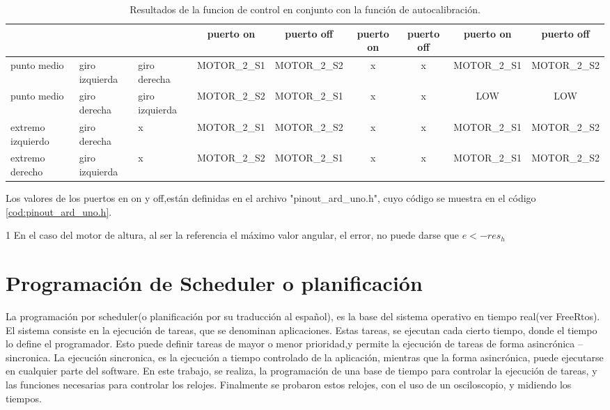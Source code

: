 \begin{table}[ht]
{\begin{threeparttable}
\begin{tabular}{|p{1.5cm}|p{1.5cm}|p{1.5cm}|c|c|c|c|c|c|}
		& &  & puerto on & puerto off &puerto on & puerto off&puerto on & puerto off\\ 
		\hline 
		punto medio & giro izquierda & giro derecha &  MOTOR\_2\_S1 &  MOTOR\_2\_S2  & x & x &MOTOR\_2\_S1 &MOTOR\_2\_S2 \\ 
		\hline 
		punto medio & giro derecha & giro izquierda & MOTOR\_2\_S2 & MOTOR\_2\_S1 & x & x & LOW &LOW \\ 
		\hline  
		extremo izquierdo & giro derecha &x & MOTOR\_2\_S1 & MOTOR\_2\_S2  &   x  & x  &MOTOR\_2\_S1 &MOTOR\_2\_S2 \\ 
		\hline 
		extremo derecho & giro izquierda & x & MOTOR\_2\_S2 & MOTOR\_2\_S1  & x  & x  &MOTOR\_2\_S1 &MOTOR\_2\_S2 \\ 
		\hline 
	\end{tabular}
	\begin{tablenotes}
	 	\small 
	 	\item Los valores de los puertos en on y off,están definidas en el archivo "pinout\_ard\_uno.h", cuyo código se muestra en el código  \ref{cod:pinout_ard_uno.h}.
	 	
	 	\item [1] En el caso del motor de altura, al ser la referencia el máximo valor angular, el error, no puede darse que $e < -res_h $  
	\end{tablenotes}
	\end{threeparttable}
}	
	\caption{Resultados de la funcion de control en conjunto con la función de autocalibración.}
	\label{tab:result_control}
\end{table}
\vspace{20mm}

\section{Programación de Scheduler o planificación}

La programación por scheduler(o planificación por su traducción al español), es la base del sistema operativo en tiempo real(ver FreeRtos). El sistema consiste en la ejecución de tareas, que se denominan aplicaciones. Estas tareas, se ejecutan cada cierto tiempo, donde el tiempo lo define el programador. Esto puede definir tareas de mayor o menor prioridad,y permite la ejecución de tareas de forma asincrónica – sincronica. La ejecución sincronica, es la ejecución a tiempo controlado de la aplicación, mientras que la forma asincrónica, puede ejecutarse en cualquier parte del software. En este trabajo, se realiza, la programación de una base de tiempo para controlar la ejecución de tareas, y las funciones necesarias para controlar los relojes. Finalmente se probaron estos relojes, con el uso de un osciloscopio, y midiendo los tiempos.

